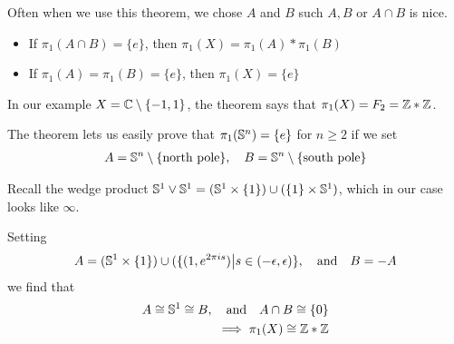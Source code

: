 
Often when we use this theorem, we chose $A$ and $B$ such $A,B$ or $A \cap B$ is nice.
\begin{itemize}
  \item If $\pi_1(A \cap B) = \{e\}$, then $\pi_1(X) = \pi_1(A) \ast \pi_1(B)$
  \item If $\pi_1(A) = \pi_1(B) = \{e\}$, then $\pi_1(X) = \{e\}$
\end{itemize}


In our example $X = \mathbb{C} \setminus \{-1,1\}$, the theorem says that $\pi_1(X) = F_2 = \mathbb{Z} \ast \mathbb{Z}$.

The theorem lets us easily prove that $\pi_1(\mathbb{S}^{n}) = \{e\}$ for $n \geq 2$ if we set 
\begin{align*}
  A = \mathbb{S}^{n} \setminus \{\text{north pole}\}, \quad B = \mathbb{S}^{n} \setminus \{\text{south pole}\}
\end{align*}


\begin{ex}[]
  Recall the wedge product $\mathbb{S}^{1} \vee\mathbb{S}^{1} = (\mathbb{S}^{1} \times \{1\}) \cup (\{1\} \times \mathbb{S}^{1})$, which in our case looks like $\infty$.

  Setting
  \begin{align*}
    A = (\mathbb{S}^{1} \times \{1\}) \cup (\{(1,e^{2 \pi i s}) \big\vert s \in (-\epsilon,\epsilon)\}
    , \quad \text{and} \quad
    B = -A
  \end{align*}
  we find that
  \begin{align*}
    A \cong \mathbb{S}^{1} \cong B, \quad \text{and} \quad A \cap B \cong \{0\}\\
    \implies \pi_1(X) \cong \mathbb{Z} \ast \mathbb{Z}
  \end{align*}
\end{ex}

